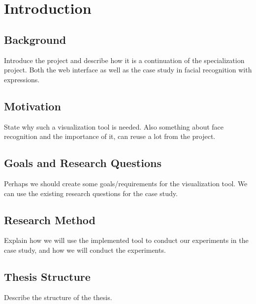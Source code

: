 
\chapter{Introduction}

\section{Background}

Introduce the project and describe how it is a continuation of the specialization project. Both the web interface as well as the case study in facial recognition with expressions.

\section{Motivation}

State why such a visualization tool is needed.
Also something about face recognition and the importance of it, can reuse a lot from the project.

\section{Goals and Research Questions}

Perhaps we should create some goals/requirements for the visualization tool.
We can use the existing research questions for the case study.

\section{Research Method}

Explain how we will use the implemented tool to conduct our experiments in the case study, and how we will conduct the experiments.

\section{Thesis Structure}

Describe the structure of the thesis.

\cleardoublepage